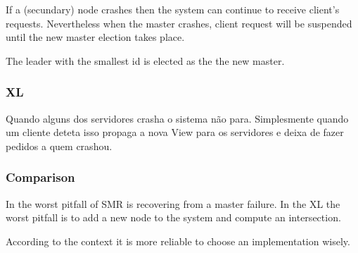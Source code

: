 \documentclass[times, 10pt,twocolumn]{article}
\begin{document}
If a (secundary) node crashes then the system can continue to receive client's requests. Nevertheless when the master crashes, client request will be suspended until the new master election takes place.

The leader with the smallest id is elected as the the new master.

\subsubsection{XL}

Quando alguns dos servidores crasha o sistema não para. Simplesmente quando um cliente deteta isso propaga a nova View para os servidores e 
deixa de fazer pedidos a quem crashou.


\subsubsection{Comparison}

In the worst pitfall of SMR is recovering from a master failure. In the XL the worst pitfall is to add a new node to the system and compute an intersection.

According to the context it is more reliable to choose an implementation wisely.



\end{document}
